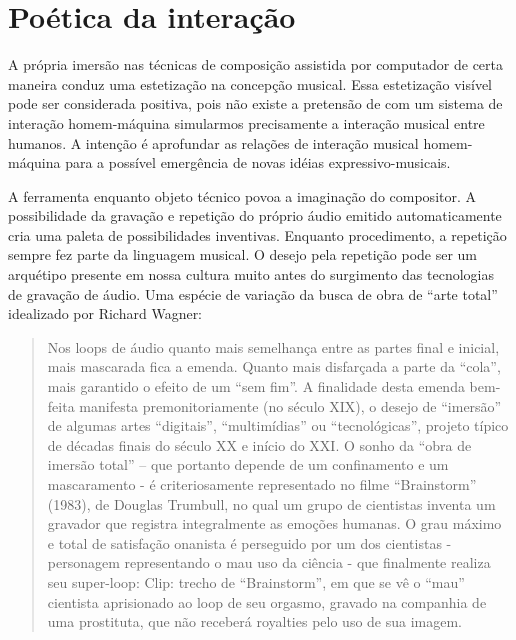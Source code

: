\documentclass{ppgmus}
\begin{document}
\section{Poética da interação}




A própria imersão nas técnicas de composição assistida por computador de certa
maneira conduz uma estetização na concepção musical. Essa estetização visível
pode ser considerada positiva, pois não existe a pretensão de com um sistema 
de interação homem-máquina simularmos precisamente a interação musical entre
humanos. A intenção é aprofundar as relações de interação musical homem-máquina
para a possível emergência de novas idéias expressivo-musicais. 







A ferramenta enquanto objeto técnico povoa a imaginação do compositor. A possibilidade
da gravação e repetição do próprio áudio emitido automaticamente cria uma paleta de
possibilidades inventivas. Enquanto procedimento, a repetição sempre fez parte da linguagem
musical. O desejo pela repetição pode ser um arquétipo presente em nossa cultura
muito antes do surgimento das tecnologias de gravação de áudio. Uma espécie
de variação da busca de obra de ``arte total'' idealizado por Richard Wagner: 


\begin{quote}
 Nos loops de áudio quanto mais semelhança entre as partes final e inicial, mais mascarada fica a
emenda. Quanto mais disfarçada a parte da ``cola'', mais garantido o efeito de um ``sem fim''. A finalidade
desta emenda bem-feita manifesta premonitoriamente (no século XIX), o desejo de ``imersão'' de algumas
artes ``digitais'', ``multimídias'' ou ``tecnológicas'', projeto típico de décadas finais do século XX e início do
XXI. O sonho da ``obra de imersão total'' – que portanto depende de um confinamento e um mascaramento -
é criteriosamente representado no filme ``Brainstorm'' (1983), de Douglas Trumbull, no qual um grupo de
cientistas inventa um gravador que registra integralmente as emoções humanas. O grau máximo e total de
satisfação onanista é perseguido por um dos cientistas - personagem representando o mau uso da ciência -
que finalmente realiza seu super-loop:
Clip: trecho de ``Brainstorm'', em que se vê o ``mau'' cientista aprisionado ao loop de seu orgasmo, gravado na
companhia de uma prostituta, que não receberá royalties pelo uso de sua imagem. \cite{caesarloop}
\end{quote} 
\end{document}

